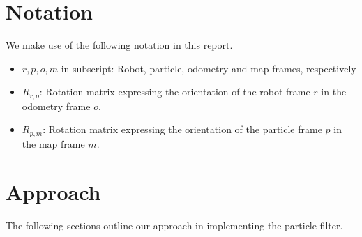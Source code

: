 \documentclass[11pt]{article}
\begin{document}
\section{Notation}
We make use of the following notation in this report.
\begin{itemize}
\item $r,p,o,m$ in subscript: Robot, particle, odometry and map frames, respectively
\item $R_{r,o}$: Rotation matrix expressing the orientation of the robot frame $r$ in the odometry frame $o$.
\item $R_{p,m}$: Rotation matrix expressing the orientation of the particle frame $p$ in the map frame $m$.
\end{itemize}

\section{Approach}
The following sections outline our approach in implementing the particle filter.
\end{document}
